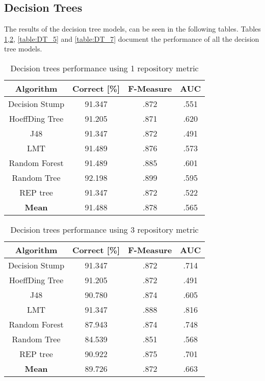 \subsection{Decision Trees}
The results of the decision tree models, can be seen in the following tables. Tables \ref{table:DT_1},\ref{table:DT_3}, \ref{table:DT_5} and \ref{table:DT_7} document the performance of all the decision tree models.
\begin{table}[h!]
\centering
\begin{tabular}{ |c|c|c|c| }
 \hline
 \textbf{Algorithm} & \textbf{Correct [\%]} & \textbf{F-Measure} & \textbf{AUC}  \\
 \hline
 Decision Stump & 91.347 & .872 & .551    \\
 \hline
 HoeffDing Tree &  91.205 & .871 & .620   \\
 \hline
  J48 & 91.347 & .872 & .491\\
 \hline
  LMT & 91.489 & .876 & .573  \\
 \hline
  Random Forest & 91.489 & .885 & .601 \\
 \hline
  Random Tree & 92.198 & .899 & .595 \\
 \hline
 REP tree  & 91.347 & .872 & .522 \\
 \hline
 \textbf{Mean}  & 91.488 & .878 & .565 \\
 \hline
\end{tabular}
\caption{Decision trees performance using 1 repository metric}
\label{table:DT_1}
\end{table}

\begin{table}[h!]
\centering
\begin{tabular}{ |c|c|c|c| }
 \hline
 \textbf{Algorithm} & \textbf{Correct [\%]} & \textbf{F-Measure} & \textbf{AUC}  \\
 \hline
 Decision Stump & 91.347 & .872 & .714    \\
 \hline
 HoeffDing Tree &  91.205 & .872 & .491   \\
 \hline
  J48 & 90.780 & .874 & .605\\
 \hline
  LMT & 91.347 & .888 & .816  \\
 \hline
  Random Forest & 87.943 & .874 & .748 \\
 \hline
  Random Tree & 84.539 & .851 & .568 \\
 \hline
 REP tree  & 90.922 & .875 & .701 \\
 \hline
 \textbf{Mean}  & 89.726 & .872 & .663 \\
 \hline

\end{tabular}
\caption{Decision trees performance using 3 repository metric}
\label{table:DT_3}
\end{table}

